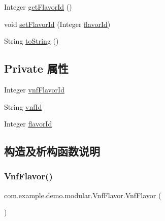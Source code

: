 \begin{DoxyCompactItemize}
\item 
Integer \mbox{\hyperlink{classcom_1_1example_1_1demo_1_1modular_1_1_vnf_flavor_afae3148af64ee158a6b4f4ece6f94031}{get\+Flavor\+Id}} ()
\item 
void \mbox{\hyperlink{classcom_1_1example_1_1demo_1_1modular_1_1_vnf_flavor_a588202db20343f86e1a7f7ab70f3867c}{set\+Flavor\+Id}} (Integer \mbox{\hyperlink{classcom_1_1example_1_1demo_1_1modular_1_1_vnf_flavor_ac586094d1ac586a5924980aab97956a9}{flavor\+Id}})
\item 
String \mbox{\hyperlink{classcom_1_1example_1_1demo_1_1modular_1_1_vnf_flavor_af8c264de7b945d5c60e28266b948b3c2}{to\+String}} ()
\end{DoxyCompactItemize}
\subsection*{Private 属性}
\begin{DoxyCompactItemize}
\item 
Integer \mbox{\hyperlink{classcom_1_1example_1_1demo_1_1modular_1_1_vnf_flavor_a5ea2954222a779e7d24dcc186c3c5a70}{vnf\+Flavor\+Id}}
\item 
String \mbox{\hyperlink{classcom_1_1example_1_1demo_1_1modular_1_1_vnf_flavor_a1426a701ef8184b60e4839b9ad9c459d}{vnf\+Id}}
\item 
Integer \mbox{\hyperlink{classcom_1_1example_1_1demo_1_1modular_1_1_vnf_flavor_ac586094d1ac586a5924980aab97956a9}{flavor\+Id}}
\end{DoxyCompactItemize}


\subsection{构造及析构函数说明}
\mbox{\label{classcom_1_1example_1_1demo_1_1modular_1_1_vnf_flavor_a3f243a0e5d27dbf5ec9eefc2ca6a74ee}} 
\subsubsection{\texorpdfstring{Vnf\+Flavor()}{VnfFlavor()}\hspace{0.1cm}{\footnotesize\ttfamily [1/3]}}
{\footnotesize\ttfamily com.\+example.\+demo.\+modular.\+Vnf\+Flavor.\+Vnf\+Flavor (\begin{DoxyParamCaption}{ }\end{DoxyParamCaption})}

